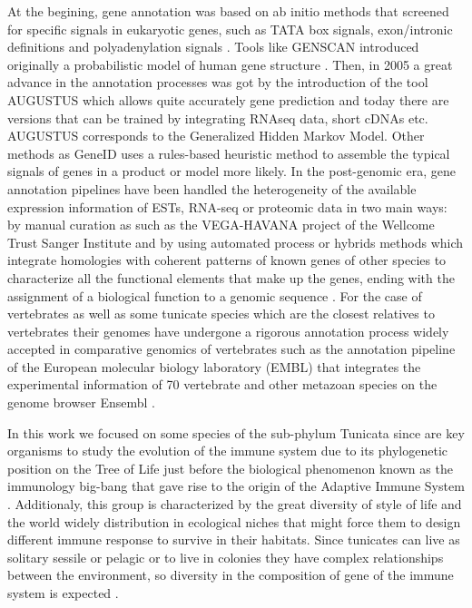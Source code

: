 \documentclass[11pt]{article}
\begin{document}
At the begining, gene annotation was based on ab initio methods that screened 
for  specific signals  in eukaryotic genes, such as TATA box signals, 
exon/intronic definitions and polyadenylation signals \cite{claverie}. Tools 
like GENSCAN introduced originally a probabilistic model of human gene structure 
\cite{genescan}. Then, in 2005 a great advance in the annotation processes was 
got by the introduction of the tool AUGUSTUS \cite{augustus} which allows quite 
accurately gene prediction and today there are versions that can be trained by 
integrating RNAseq data, short cDNAs etc. AUGUSTUS corresponds to the 
Generalized Hidden Markov Model. Other methods as GeneID uses a rules-based 
heuristic method to assemble the typical signals of genes in a product or model 
more likely. In the post-genomic era, gene annotation pipelines have been 
handled the heterogeneity of the available expression information of ESTs, 
RNA-seq or proteomic data in two main ways: by manual curation as such as the 
VEGA-HAVANA project of the Wellcome Trust Sanger Institute and by using 
automated process or hybrids methods which integrate homologies with coherent 
patterns of known genes of other species to characterize all the functional 
elements that make up the genes, ending with the assignment of a biological 
function to a genomic sequence \cite{aken2016ensembl} \cite{birney2004overview}. 
For the case of vertebrates as well as some tunicate species which are the 
closest relatives to vertebrates \cite{delsuc2006} their genomes have undergone 
a rigorous annotation process widely accepted in comparative genomics of 
vertebrates such as the annotation pipeline of the European molecular biology 
laboratory (EMBL) that integrates the experimental information of 70 vertebrate 
and other metazoan species on the genome browser Ensembl \cite{aken2016ensembl}.

In this work we focused on some species of the sub-phylum Tunicata since are 
key organisms to study the evolution of the immune system due to its 
phylogenetic position on the Tree of Life just before the biological phenomenon 
known as the immunology big-bang that gave rise to the origin of the Adaptive 
Immune System \cite{bernstein1996}. Additionaly, this group is characterized by 
the great diversity of style of life and the world widely distribution in 
ecological niches that might force them to design different immune response to 
survive in their habitats. Since tunicates can live as solitary sessile or 
pelagic or to live in colonies they have complex relationships between the 
environment, so diversity in the composition of gene of the immune system is 
expected  \cite{carroll2008evo, berna2014evolutionary}. 
\end{document}
